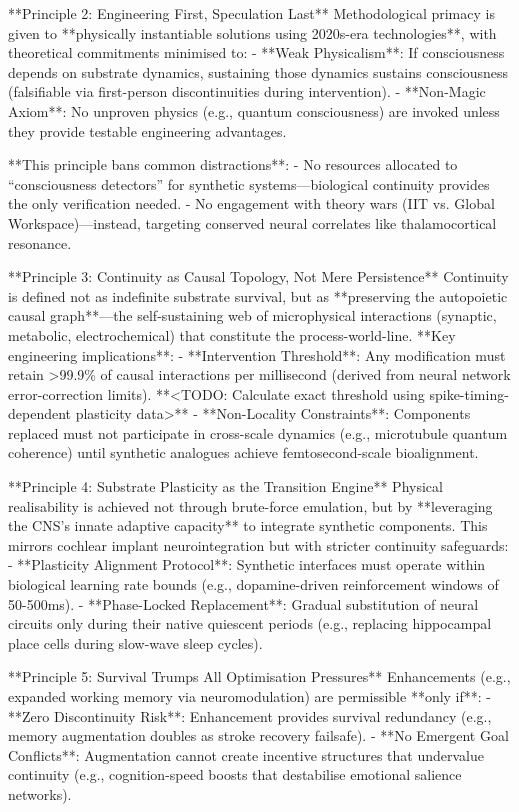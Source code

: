 \documentclass[10pt]{article}
\begin{document}
\begin{sloppypar}
  **Principle 2: Engineering First, Speculation Last**
  Methodological primacy is given to **physically instantiable solutions using 2020s-era technologies**, with theoretical commitments minimised to:
  - **Weak Physicalism**: If consciousness depends on substrate dynamics, sustaining those dynamics sustains consciousness (falsifiable via first-person discontinuities during intervention).
  - **Non-Magic Axiom**: No unproven physics (e.g., quantum consciousness) are invoked unless they provide testable engineering advantages.

  **This principle bans common distractions**:
  - No resources allocated to “consciousness detectors” for synthetic systems—biological continuity provides the only verification needed.
  - No engagement with theory wars (IIT vs. Global Workspace)—instead, targeting conserved neural correlates like thalamocortical resonance.

  **Principle 3: Continuity as Causal Topology, Not Mere Persistence**
  Continuity is defined not as indefinite substrate survival, but as **preserving the autopoietic causal graph**—the self-sustaining web of microphysical interactions (synaptic, metabolic, electrochemical) that constitute the process-world-line. **Key engineering implications**:
  - **Intervention Threshold**: Any modification must retain >99.9\% of causal interactions per millisecond (derived from neural network error-correction limits). **<TODO: Calculate exact threshold using spike-timing-dependent plasticity data>**
  - **Non-Locality Constraints**: Components replaced must not participate in cross-scale dynamics (e.g., microtubule quantum coherence) until synthetic analogues achieve femtosecond-scale bioalignment.

  **Principle 4: Substrate Plasticity as the Transition Engine**
  Physical realisability is achieved not through brute-force emulation, but by **leveraging the CNS’s innate adaptive capacity** to integrate synthetic components. This mirrors cochlear implant neurointegration but with stricter continuity safeguards:
  - **Plasticity Alignment Protocol**: Synthetic interfaces must operate within biological learning rate bounds (e.g., dopamine-driven reinforcement windows of 50-500ms).
  - **Phase-Locked Replacement**: Gradual substitution of neural circuits only during their native quiescent periods (e.g., replacing hippocampal place cells during slow-wave sleep cycles).

  **Principle 5: Survival Trumps All Optimisation Pressures**
  Enhancements (e.g., expanded working memory via neuromodulation) are permissible **only if**:
  - **Zero Discontinuity Risk**: Enhancement provides survival redundancy (e.g., memory augmentation doubles as stroke recovery failsafe).
  - **No Emergent Goal Conflicts**: Augmentation cannot create incentive structures that undervalue continuity (e.g., cognition-speed boosts that destabilise emotional salience networks).


\end{sloppypar}
\end{document}
